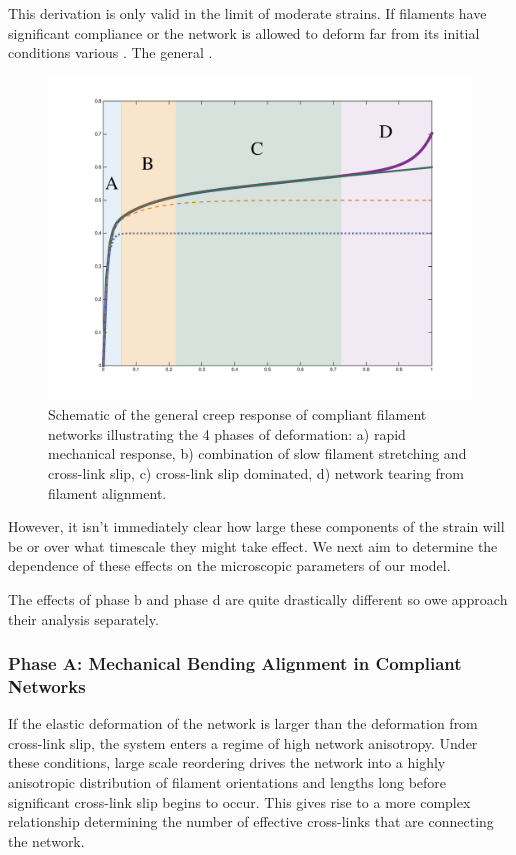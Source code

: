\documentclass[pre,reprint]{revtex4-1}
\begin{document}
This derivation is only valid in the limit of moderate strains.  If filaments have significant compliance or the network is allowed to deform far from its initial conditions various .  The general .  


\begin{figure}[h!]
\centering
\includegraphics[width=\hsize]{shear_modes}
\caption{\label{fig:shear_modes}Schematic of the general creep response of compliant filament networks illustrating the 4 phases of deformation: a) rapid mechanical response, b) combination of slow filament stretching and cross-link slip, c) cross-link slip dominated, d) network tearing from filament alignment.}
\end{figure}

However, it isn't immediately clear how large these components of the strain will be or over what timescale they might take effect.  We next aim to determine the dependence of these effects on the microscopic parameters of our model.

The effects of phase b and phase d are quite drastically different so owe approach their analysis separately.

\subsubsection{Phase A: Mechanical Bending Alignment in Compliant Networks}
If the elastic deformation of the network is larger than the deformation from cross-link slip, the system enters a regime of high network anisotropy.  Under these conditions, large scale reordering drives the network into a highly anisotropic distribution of filament orientations and lengths long before significant cross-link slip begins to occur.  This gives rise to a more complex relationship determining the number of effective cross-links that are connecting the network.  
\end{document}
